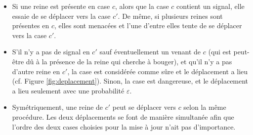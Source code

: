 \documentclass[11pt, openany]{article}
\begin{document}
\begin{itemize}

\item{ Si une reine est présente en case $c$, alors que la case $c$ contient un signal, elle essaie de se déplacer vers la case $c'$. De même, si plusieurs reines sont présentes en $c$, elles sont menacées et l'une d'entre elles tente de se déplacer vers la case $c'$.}

\item{ S'il n'y a pas de signal en $c'$ sauf éventuellement un venant de $c$ (qui est peut-être dû à la présence de la reine qui cherche à bouger), et qu'il n'y a pas d'autre reine en $c'$, la case est considérée comme sûre et le déplacement a lieu (cf. Figure \ref{fig:deplacement}). Sinon, la case est dangereuse, et le déplacement a lieu seulement avec une probabilité $\varepsilon$.
}

\item{ Symétriquement, une reine de $c'$ peut se déplacer vers $c$ selon la même procédure. Les deux déplacements se font de manière simultanée afin que l'ordre des deux cases choisies pour la mise à jour n'ait pas d'importance.}

\end{itemize}

\end{document}
